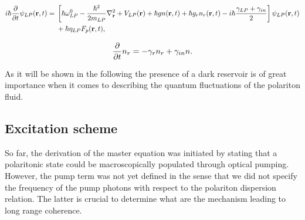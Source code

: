 \begin{align}
    \begin{split}
        i \hbar \dfrac{\partial}{\partial t} \psi_{LP}(\mathbf{r}, t) ={}& \left[ \hbar \omega_{LP}^0 -\dfrac{\hbar^2}{2 m_{LP}}\nabla_{\mathbf{r}}^2 + V_{LP}(\mathbf{r}) + \hbar g n(\mathbf{r}, t) + \hbar g_r n_r(\mathbf{r}, t) - i \hbar \dfrac{\gamma_{LP} + \gamma_{in}}{2} \right] \psi_{LP}(\mathbf{r}, t)  \\&+ \hbar \eta_{LP} F_p(\mathbf{r}, t),
    \end{split}
    \end{align}
    
    \begin{equation}
         \dfrac{\partial}{\partial t} n_r = -\gamma_r n_r + \gamma_{in} n.
    \label{reservoir_eq}
    \end{equation}

As it will be shown in the following the presence of a dark reservoir is of great importance when it comes to describing the quantum fluctuations of the polariton fluid.


\subsection{Excitation scheme} So far, the derivation of the master equation was initiated by stating that a polaritonic state could be macroscopically populated 
through optical pumping. However, the pump term was not yet defined in the sense that we did not specify the frequency of the pump photons with respect to the polariton dispersion relation.
The latter is crucial to determine what are the mechanism leading to long range coherence. 

\bigskip

